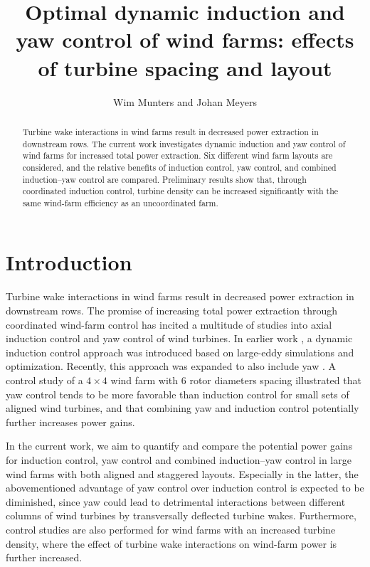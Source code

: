\documentclass[a4paper]{jpconf}
\begin{document}
\title{Optimal dynamic induction and yaw control of wind farms: effects of turbine spacing and layout}

\author{Wim Munters and Johan Meyers}

\address{Department of Mechanical Engineering, KU Leuven, Celestijnenlaan 300A, B3001 Leuven, Belgium}


\begin{abstract}
Turbine wake interactions in wind farms result in decreased power extraction in downstream rows. The current work investigates dynamic induction and yaw control of wind farms for increased total power extraction. Six different wind farm layouts are considered, and the relative benefits of induction control, yaw control, and combined induction--yaw control are compared. Preliminary results show that, through coordinated induction control, turbine density can be increased significantly with the same wind-farm efficiency as an uncoordinated farm.
\end{abstract}

\section{Introduction}
Turbine wake interactions in wind farms result in decreased power extraction in downstream rows. The promise of increasing total power extraction through coordinated wind-farm control has incited a multitude of studies into axial induction control and yaw control of wind turbines. In earlier work \cite{goit, munters}, a dynamic induction control approach was introduced based on large-eddy simulations and optimization. Recently, this approach was expanded to also include yaw \cite{phd}. A control study of a $4 \times 4$ wind farm with 6 rotor diameters spacing illustrated that yaw control tends to be more favorable than induction control for small sets of aligned wind turbines, and that combining yaw and induction control potentially further increases power gains. 

In the current work, we aim to quantify and compare the potential power gains for induction control, yaw control and combined induction--yaw control in large wind farms with both aligned and staggered layouts. Especially in the latter, the abovementioned advantage of yaw control over induction control is expected to be diminished, since yaw could lead to detrimental interactions between different columns of wind turbines by transversally deflected turbine wakes. Furthermore, control studies are also performed for wind farms with an increased turbine density, where the effect of turbine wake interactions on wind-farm power is further increased.  
\end{document}

